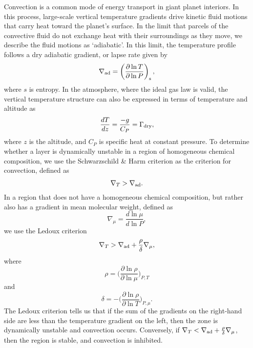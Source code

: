 \documentclass[11pt]{ucscthesisbs}
\begin{document}
Convection is a common mode of energy transport in giant planet interiors. In this process, large-scale vertical temperature gradients drive kinetic fluid motions that carry heat toward the planet's surface. In the limit that parcels of the convective fluid do not exchange heat with their surroundings as they move, we describe the fluid motions as `adiabatic'. In this limit, the temperature profile follows a dry adiabatic gradient, or lapse rate \citep{kippenhahn_2012} given by
\begin{equation}
  \nabla_{\rm ad} = \left( \frac{\partial \ln T}{\partial \ln P} \right)_{\rm s},
  \label{eq:dry_lapse_rate}
\end{equation}
where $s$ is entropy. In the atmosphere, where the ideal gas law is valid, the vertical temperature structure can also be expressed in terms of temperature and altitude \citep{sanchez-lavega} as
\begin{equation}
  \frac{dT}{dz} = \frac{-g}{C_{P}} = \Gamma_{\rm dry},
\end{equation}
where $z$ is the altitude, and $C_{P}$ is specific heat at constant pressure. To determine whether a layer is dynamically unstable in a region of homogeneous chemical composition, we use the Schwarzschild \& Harm criterion \citep{kippenhahn_2012} as the criterion for convection, defined as
 \begin{equation}
  \nabla_{T} > \nabla_{\rm ad}.
\end{equation}
In a region that does not have a homogeneous chemical composition, but rather also has a gradient in mean molecular weight, defined as
 \begin{equation}
 \nabla_{\mu} = \frac{d \ln \mu}{d \ln P}, 
\end{equation}
 we use the Ledoux criterion\citep{kippenhahn_2012}
\begin{equation}
  \nabla_{T} > \nabla_{\rm ad} + \frac{\rho}{\delta}\nabla_{\mu},
  \label{eq:ledoux}
\end{equation}
where
\begin{equation}
  \rho = \bigg(\frac{\partial \ln \rho}{\partial \ln \mu}\bigg)_{P,T}
\end{equation}
and
\begin{equation}
 \delta = -\bigg(\frac{\partial \ln \rho}{\partial \ln T}\bigg)_{P,\mu}.
\end{equation}
The Ledoux criterion tells us that if the sum of the gradients on the right-hand side are less than the temperature gradient on the left, then the zone is dynamically unstable and convection occurs. Conversely, if $\nabla_{T} < \nabla_{\rm ad} + \frac{\rho}{\delta}\nabla_{\mu}$, then the region is stable, and convection is inhibited.
\end{document}
